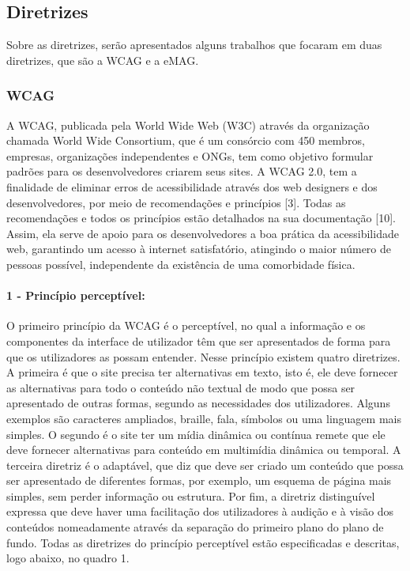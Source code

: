 \documentclass[a4paper]{article}
\begin{document}
\begin{titlepage}
\subsection{Diretrizes}
Sobre as diretrizes, serão apresentados alguns trabalhos que focaram em duas diretrizes, que são a WCAG e a eMAG.

\subsubsection{WCAG}

A WCAG, publicada pela World Wide Web (W3C) através da organização chamada World Wide Consortium, que é um consórcio com 450 membros, empresas, organizações independentes e ONGs, tem como objetivo formular padrões para os desenvolvedores criarem seus sites. A WCAG 2.0, tem a finalidade de eliminar erros de acessibilidade através dos web designers e dos desenvolvedores, por meio de recomendações e princípios [3]. Todas as recomendações e todos os princípios estão detalhados na sua documentação [10]. Assim, ela serve de apoio para os desenvolvedores a boa prática da acessibilidade web, garantindo um acesso à internet satisfatório, atingindo o maior número de pessoas possível, independente da existência de uma comorbidade física.

\paragraph{1 - Princípio perceptível:}

O primeiro princípio da WCAG é o perceptível, no qual a informação e os componentes da interface de utilizador têm que ser apresentados de forma para que os utilizadores as possam entender. Nesse princípio existem quatro diretrizes. A primeira é que o site precisa ter alternativas em texto, isto é, ele deve fornecer as alternativas para todo o conteúdo não textual de modo que possa ser apresentado de outras formas, segundo as necessidades dos utilizadores. Alguns exemplos são caracteres ampliados, braille, fala, símbolos ou uma linguagem mais simples. O segundo é o site ter um mídia dinâmica ou contínua remete que ele deve fornecer alternativas para conteúdo em multimídia dinâmica ou temporal. A terceira diretriz é o adaptável, que diz que deve ser criado um conteúdo que possa ser apresentado de diferentes formas, por exemplo, um esquema de página mais simples, sem perder informação ou estrutura. Por fim, a diretriz distinguível expressa que deve haver uma facilitação dos utilizadores à audição e à visão dos conteúdos nomeadamente através da separação do primeiro plano do plano de fundo. Todas as diretrizes do princípio perceptível estão especificadas e descritas, logo abaixo, no quadro 1.


\end{titlepage}
\end{document}
